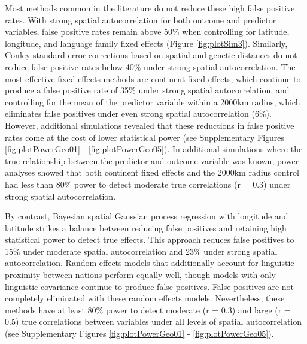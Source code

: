 \documentclass[
  man,floatsintext]{apa6}
\begin{document}
Most methods common in the literature do not reduce these high false positive rates. With strong spatial autocorrelation for both outcome and predictor variables, false positive rates remain above 50\% when controlling for latitude, longitude, and language family fixed effects (Figure \ref{fig:plotSim3}). Similarly, Conley standard error corrections based on spatial and genetic distances do not reduce false positive rates below 40\% under strong spatial autocorrelation. The most effective fixed effects methods are continent fixed effects, which continue to produce a false positive rate of 35\% under strong spatial autocorrelation, and controlling for the mean of the predictor variable within a 2000km radius, which eliminates false positives under even strong spatial autocorrelation (6\%). However, additional simulations revealed that these reductions in false positive rates come at the cost of lower statistical power (see Supplementary Figures \ref{fig:plotPowerGeo01} - \ref{fig:plotPowerGeo05}). In additional simulations where the true relationship between the predictor and outcome variable was known, power analyses showed that both continent fixed effects and the 2000km radius control had less than 80\% power to detect moderate true correlations (r = 0.3) under strong spatial autocorrelation.

By contrast, Bayesian spatial Gaussian process regression with longitude and latitude strikes a balance between reducing false positives and retaining high statistical power to detect true effects. This approach reduces false positives to 15\% under moderate spatial autocorrelation and 23\% under strong spatial autocorrelation. Random effects models that additionally account for linguistic proximity between nations perform equally well, though models with only linguistic covariance continue to produce false positives. False positives are not completely eliminated with these random effects models. Nevertheless, these methods have at least 80\% power to detect moderate (r = 0.3) and large (r = 0.5) true correlations between variables under all levels of spatial autocorrelation (see Supplementary Figures \ref{fig:plotPowerGeo01} - \ref{fig:plotPowerGeo05}).
\end{document}
